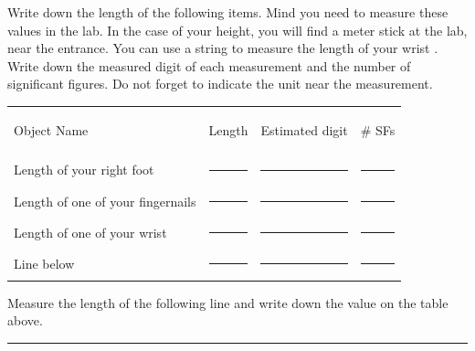 \documentclass[main.tex]{subfiles}
\begin{document}
\begin{steps}
    \newstep[] Write down the length of the following items. Mind you need to measure these values in the lab. In the case of your height, you will find a meter stick at the lab, near the entrance. 
      \newstep[] You can use a string to measure the length of your wrist .
     \newstep[] Write down the measured digit of each measurement and the number of significant figures. Do not forget to indicate the unit near the measurement.

 
\begin{center} \begin{tabular}{ p{5cm} p{3cm} p{3cm}p{3cm}   }
   \begin{bf}Object Name\end{bf} & \begin{bf}Length\end{bf} &\begin{bf}Estimated digit\end{bf} &\begin{bf}\# SFs\end{bf} \\[0.1cm]     
  Length of your right foot 				&\rule{3cm}{0.4pt}&\rule{3cm}{0.4pt}&\rule{1cm}{0.4pt}  \\[0.3cm]      
  Length of one of your fingernails 				&\rule{3cm}{0.4pt}&\rule{3cm}{0.4pt}&\rule{1cm}{0.4pt}  \\[0.3cm]      
  Length of one of your wrist 				&\rule{3cm}{0.4pt}&\rule{3cm}{0.4pt}&\rule{1cm}{0.4pt}  \\[0.3cm]   
    Line below 				&\rule{3cm}{0.4pt}&\rule{3cm}{0.4pt}&\rule{1cm}{0.4pt}  \\[0.3cm]      
 \end{tabular}
 \end{center}
 
  \newstep[] Measure the length of the following line and write down the value on the table above.
 \begin{center} \rule{7.5cm}{0.4pt}\end{center}
\end{steps}
 




 
 
\end{document}
